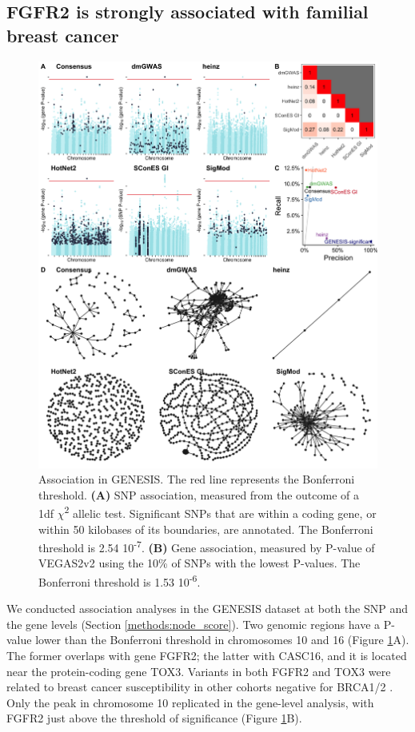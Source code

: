 \documentclass[twocolumn, 10pt]{article}
\begin{document}
\subsection{FGFR2 is strongly associated with familial breast cancer}
\label{results:conventional}
\begin{figure}[htbp]
\centering
\includegraphics[width=.9\linewidth]{./figures/figure_1.png}
\caption{\label{fig:snp_gene_manhattan}
Association in GENESIS. The red line represents the Bonferroni threshold. \textbf{(A)} SNP association, measured from the outcome of a 1df \(\chi\)\textsuperscript{2} allelic test. Significant SNPs that are within a coding gene, or within 50 kilobases of its boundaries, are annotated. The Bonferroni threshold is 2.54 \texttimes{} 10\textsuperscript{-7}. \textbf{(B)} Gene association, measured by P-value of VEGAS2v2 \cite{mishra_vegas2:_2015} using the 10\% of SNPs with the lowest P-values. The Bonferroni threshold is 1.53 \texttimes{} 10\textsuperscript{-6}.}
\end{figure}

We conducted association analyses in the GENESIS dataset at both the SNP and the gene levels (Section \ref{methods:node_score}). Two genomic regions have a P-value lower than the Bonferroni threshold in chromosomes 10 and 16 (Figure \ref{fig:snp_gene_manhattan}A). The former overlaps with gene FGFR2; the latter with CASC16, and it is located near the protein-coding gene TOX3. Variants in both FGFR2 and TOX3 were related to breast cancer susceptibility in other cohorts negative for BRCA1/2 \cite{rinella_genetic_2013}. Only the peak in chromosome 10 replicated in the gene-level analysis, with FGFR2 just above the threshold of significance (Figure \ref{fig:snp_gene_manhattan}B). 
\end{document}

